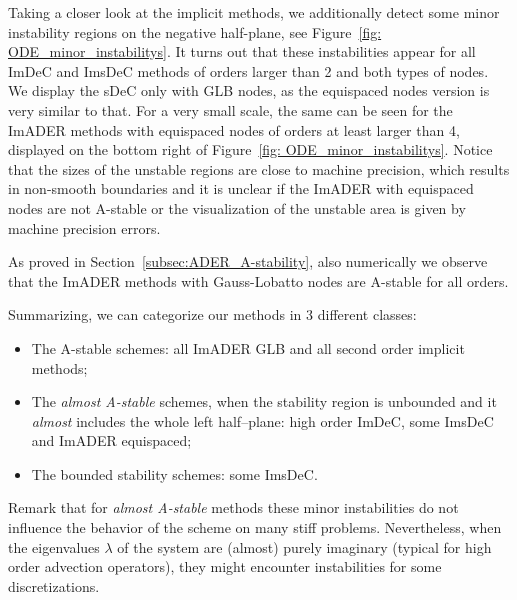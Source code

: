 Taking a closer look at the implicit methods, we additionally detect some minor instability regions on the negative half-plane, see Figure~\ref{fig: ODE_minor_instabilitys}.
It turns out that these instabilities appear for all ImDeC and ImsDeC methods of orders larger than 2 and both types of nodes. We display the sDeC only with GLB nodes, as the equispaced nodes version is very similar to that.
For a very small scale, the same can be seen for the ImADER methods with equispaced nodes of orders at least larger than 4, displayed on the bottom right of Figure~\ref{fig: ODE_minor_instabilitys}. 
Notice that the sizes of the unstable regions are close to machine precision, which results in non-smooth boundaries and it is unclear if the ImADER with equispaced nodes are not A-stable or the visualization of the unstable area is given by machine precision errors.

As proved in Section~\ref{subsec:ADER_A-stability}, also numerically we observe that the ImADER methods with Gauss-Lobatto nodes are A-stable for all orders. 



Summarizing, we can categorize our methods in 3 different classes: 
\begin{itemize}
	\item The A-stable schemes: all ImADER GLB and all second order implicit methods;
	\item The \textit{almost A-stable} schemes, when the stability region is unbounded and it \textit{almost} includes the whole left half--plane: high order ImDeC, some ImsDeC and ImADER equispaced;
	\item The bounded stability schemes: some ImsDeC.
\end{itemize}

Remark that for \textit{almost A-stable} methods these minor instabilities do not influence the behavior of the scheme on many stiff problems. Nevertheless, when the eigenvalues $\lambda$ of the system are (almost) purely imaginary (typical for high order advection operators), they might encounter instabilities for some discretizations.

